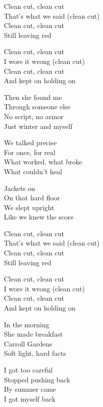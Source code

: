 \begin{lyrics}
Clean cut, clean cut\\
That’s what we said (clean cut)\\
Clean cut, clean cut\\
Still leaving red

Clean cut, clean cut\\
I wore it wrong (clean cut)\\
Clean cut, clean cut\\
And kept on holding on

Then she found me\\
Through someone else\\
No script, no armor\\
Just winter and myself

We talked precise\\
For once, for real\\
What worked, what broke\\
What couldn’t heal

Jackets on\\
On that hard floor\\
We slept upright\\
Like we knew the score

Clean cut, clean cut\\
That’s what we said (clean cut)\\
Clean cut, clean cut\\
Still leaving red

Clean cut, clean cut\\
I wore it wrong (clean cut)\\
Clean cut, clean cut\\
And kept on holding on

In the morning\\
She made breakfast\\
Carroll Gardens\\
Soft light, hard facts

I got too careful\\
Stopped pushing back\\
By summer came\\
I got myself back
\end{lyrics}


